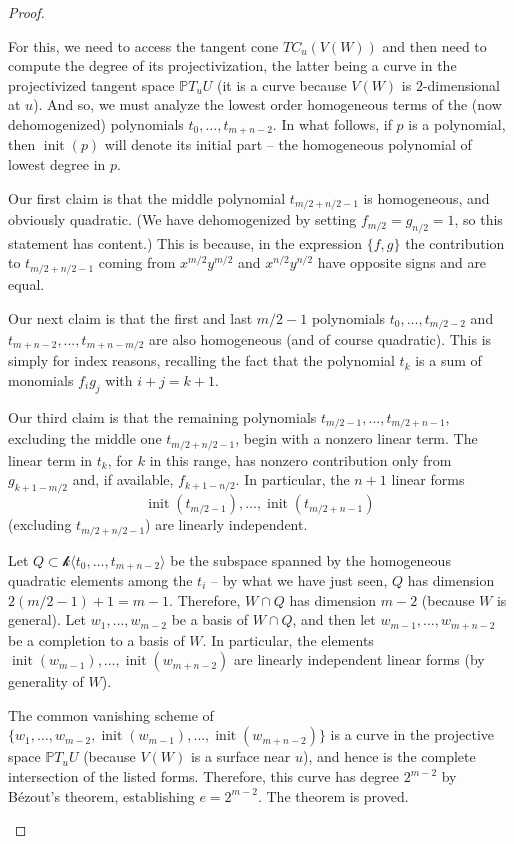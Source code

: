 \documentclass[reqno, 11pt]{amsart}
\theoremstyle{plain}
\theoremstyle{remark}
\renewcommand{\P}{\mathbb{P}}
\renewcommand{\k}{\mathscr{k}}
\DeclareMathOperator{\init}{init}
\begin{document}
\begin{proof}
\begin{enumerate}
        For this, we need to access the tangent cone $TC_{u}(V(W))$ and then need to compute the degree of its projectivization, the latter being a curve in the projectivized tangent space $\P T_{u} U$ (it is a curve because $V(W)$ is $2$-dimensional at $u$).  And so, we must analyze the lowest order homogeneous terms of the (now dehomogenized) polynomials $t_0, \dots, t_{m+n-2}$. In what follows, if $p$ is a polynomial, then $\init(p)$ will denote its initial part -- the homogeneous polynomial of lowest degree in $p$.
    
        Our first claim is that the middle polynomial $t_{m/2 +n/2 - 1}$ is homogeneous, and obviously quadratic. (We have dehomogenized by setting $f_{m/2} = g_{n/2} = 1$, so this statement has content.) This is because, in the expression $\{f,g\}$ the contribution to $t_{m/2 +n/2 - 1}$ coming from $x^{m/2}y^{m/2}$ and $x^{n/2}y^{n/2}$ have opposite signs and are equal.  
    
        Our next claim is that the first and last $m/2-1$ polynomials $t_0, \dots, t_{m/2-2}$ and $t_{m+n-2}, \dots, t_{m+n-m/2}$ are also homogeneous (and of course quadratic).  This is simply for index reasons, recalling the fact that the polynomial $t_k$ is a sum of monomials $f_{i}g_{j}$ with $i+j = k+1$. 
    
        Our third claim is that the remaining polynomials $t_{m/2-1}, \dots, t_{m/2+n-1}$, excluding the middle one $t_{m/2+n/2-1}$, begin with a nonzero linear term.  The linear term in $t_{k}$, for $k$ in this range, has nonzero contribution only from $g_{k+1-m/2}$ and, if available, $f_{k+1-n/2}$.  In particular, the $n+1$ linear forms $$\init(t_{m/2-1}), \dots, \init(t_{m/2+n-1})$$ (excluding $t_{m/2+n/2-1}$) are linearly independent. 
    
        Let $Q \subset \k \langle t_0, \dots, t_{m+n-2} \rangle$ be the subspace spanned by the homogeneous quadratic elements among the $t_{i}$ -- by what we have just seen, $Q$ has dimension $2(m/2-1)+1 = m-1$.  Therefore, $W \cap Q$ has dimension $m-2$ (because $W$ is general). Let $w_{1}, \dots, w_{m-2}$ be a basis of $W \cap Q$, and then let $w_{m-1}, \dots, w_{m+n-2}$ be a completion to a basis of $W$.  In particular, the elements $\init(w_{m-1}), \dots, \init(w_{m+n-2})$ are linearly independent linear forms (by generality of $W$).
    
        The common vanishing scheme of $\{w_{1}, \dots, w_{m-2},\init(w_{m-1}), \dots, \init(w_{m+n-2})\}$ is a curve in the projective space $\P T_{u}U$ (because $V(W)$ is a surface near $u$), and hence is the complete intersection of the listed forms. Therefore, this curve has degree $2^{m-2}$ by B\'ezout's theorem, establishing $e = 2^{m-2}$. The theorem is proved.
    \end{enumerate}
    \end{proof}
\end{document}
